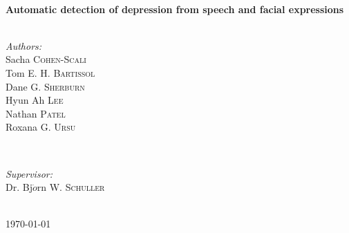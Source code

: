 \documentclass{article}
\begin{document}
\begin{titlepage}

\HRule \\[0.4cm]
{ \huge \bfseries Automatic detection of depression from speech and facial expressions}\\[0.4cm] %
\HRule \\[1.5cm]
 

\begin{minipage}{0.5\textwidth}
\begin{flushleft} \large
\emph{Authors:}\\
Sacha \textsc{Cohen-Scali}\\
Tom E. H. \textsc{Bartissol}\\
Dane G. \textsc{Sherburn}\\
Hyun Ah \textsc{Lee}\\
Nathan \textsc{Patel}\\
Roxana G. \textsc{Ursu}\\
\end{flushleft}
\end{minipage}
~
\begin{minipage}{0.4\textwidth}
\begin{flushright} \large
\emph{Supervisor:} \\
Dr. Bj$\ddot{o}$rn W. \textsc{Schuller} %
\end{flushright}
\end{minipage}\\[4cm]



{\large \today}\\[3cm] %


\vfill %

\end{titlepage}
\end{document}
